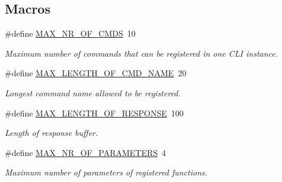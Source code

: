 \subsection*{Macros}
\begin{DoxyCompactItemize}
\item 
\hypertarget{group___s_i_m_p_l_e___c_l_i_gac5c0c1eca89291c3464b4ff294b13f05}{\#define \hyperlink{group___s_i_m_p_l_e___c_l_i_gac5c0c1eca89291c3464b4ff294b13f05}{M\+A\+X\+\_\+\+N\+R\+\_\+\+O\+F\+\_\+\+C\+M\+D\+S}~10}\label{group___s_i_m_p_l_e___c_l_i_gac5c0c1eca89291c3464b4ff294b13f05}

\begin{DoxyCompactList}\small\item\em Maximum number of commands that can be registered in one C\+L\+I instance. \end{DoxyCompactList}\item 
\hypertarget{group___s_i_m_p_l_e___c_l_i_gabd0278272d66be331cab5531626c475d}{\#define \hyperlink{group___s_i_m_p_l_e___c_l_i_gabd0278272d66be331cab5531626c475d}{M\+A\+X\+\_\+\+L\+E\+N\+G\+T\+H\+\_\+\+O\+F\+\_\+\+C\+M\+D\+\_\+\+N\+A\+M\+E}~20}\label{group___s_i_m_p_l_e___c_l_i_gabd0278272d66be331cab5531626c475d}

\begin{DoxyCompactList}\small\item\em Longest command name allowed to be registered. \end{DoxyCompactList}\item 
\hypertarget{group___s_i_m_p_l_e___c_l_i_ga17e61582091ee023dd2d011f13e8f971}{\#define \hyperlink{group___s_i_m_p_l_e___c_l_i_ga17e61582091ee023dd2d011f13e8f971}{M\+A\+X\+\_\+\+L\+E\+N\+G\+T\+H\+\_\+\+O\+F\+\_\+\+R\+E\+S\+P\+O\+N\+S\+E}~100}\label{group___s_i_m_p_l_e___c_l_i_ga17e61582091ee023dd2d011f13e8f971}

\begin{DoxyCompactList}\small\item\em Length of response buffer. \end{DoxyCompactList}\item 
\hypertarget{group___s_i_m_p_l_e___c_l_i_gad8bacdd29d97762d63a242cba6444b32}{\#define \hyperlink{group___s_i_m_p_l_e___c_l_i_gad8bacdd29d97762d63a242cba6444b32}{M\+A\+X\+\_\+\+N\+R\+\_\+\+O\+F\+\_\+\+P\+A\+R\+A\+M\+E\+T\+E\+R\+S}~4}\label{group___s_i_m_p_l_e___c_l_i_gad8bacdd29d97762d63a242cba6444b32}

\begin{DoxyCompactList}\small\item\em Maximum number of parameters of registered functions. \end{DoxyCompactList}\end{DoxyCompactItemize}
